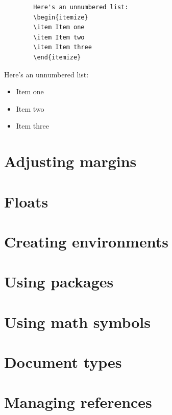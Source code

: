 \documentclass[12pts]{article}
\begin{document}
	\begin{multicols}{2}
		\begin{Verbatim}
		Here's an unnumbered list:
		\begin{itemize}
		\item Item one
		\item Item two
		\item Item three
		\end{itemize}
		\end{Verbatim}
		
		\columnbreak	
		
		Here's an unnumbered list:
		\begin{itemize}
			\item Item one
			\item Item two
			\item Item three
		\end{itemize}
	\end{multicols}
	
	\section{Adjusting margins}
	\section{Floats}
	\section{Creating environments}
	\section{Using packages}
	\section{Using math symbols}
	\section{Document types}
	\section{Managing references}
\end{document}
